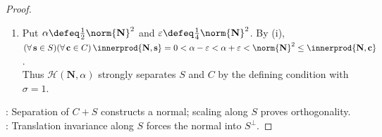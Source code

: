 \begin{theorem}
\begin{proof}
\begin{enumerate}[label=(\roman*)]
Fix $\mathbf{c}_0\in C$ and suppose $\mathbf{s}\in S$ satisfies $a\defeq\innerprod{\mathbf{N},\mathbf{s}}\neq0$. Set $\lambda\defeq\frac{\norm{\mathbf{N}}^2-\innerprod{\mathbf{N},\mathbf{c}_0}-1}{a}$. Then $\lambda\mathbf{s}+\mathbf{c}_0\in D$ but $\innerprod{\mathbf{N},\lambda\mathbf{s}+\mathbf{c}_0}=\norm{\mathbf{N}}^2-1$, a contradiction. Hence $(\forall\,\mathbf{s}\in S)\,\innerprod{\mathbf{N},\mathbf{s}}=0$, so $\mathbf{N}\in S^\perp$. Taking $\mathbf{s}=\mathbf{0}$ proves $\innerprod{\mathbf{N},C}\geq\norm{\mathbf{N}}^2>0$.
\item Put $\alpha\defeq\frac{1}{2}\norm{\mathbf{N}}^2$ and $\varepsilon\defeq\frac{1}{4}\norm{\mathbf{N}}^2$. By (i), $(\forall\,\mathbf{s}\in S)(\forall\,\mathbf{c}\in C)\,\innerprod{\mathbf{N},\mathbf{s}}=0<\alpha-\varepsilon<\alpha+\varepsilon<\norm{\mathbf{N}}^2\leq\innerprod{\mathbf{N},\mathbf{c}}$.\\
Thus $\mathcal{H}(\mathbf{N},\alpha)$ strongly separates $S$ and $C$ by the defining condition with $\sigma=1$.
\end{enumerate}
: Separation of $C+S$ constructs a normal; scaling along $S$ proves orthogonality.\\
: Translation invariance along $S$ forces the normal into $S^\perp$.
\end{proof}
\end{theorem}
